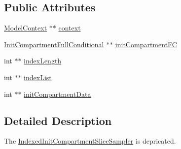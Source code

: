 \subsection*{Public Attributes}
\begin{DoxyCompactItemize}
\item 
\hyperlink{classSpatialSEIR_1_1ModelContext}{Model\-Context} $\ast$$\ast$ \hyperlink{classSpatialSEIR_1_1IndexedInitCompartmentSliceSampler_aeaa9d7c11d3bb0000f236c95a2c8f041}{context}
\item 
\hyperlink{classSpatialSEIR_1_1InitCompartmentFullConditional}{Init\-Compartment\-Full\-Conditional} $\ast$$\ast$ \hyperlink{classSpatialSEIR_1_1IndexedInitCompartmentSliceSampler_a729e2d6ea861584920909fc54d3094f0}{init\-Compartment\-F\-C}
\item 
int $\ast$$\ast$ \hyperlink{classSpatialSEIR_1_1IndexedInitCompartmentSliceSampler_ae7e9d465efab1aff109ab06aa2ca703e}{index\-Length}
\item 
int $\ast$$\ast$ \hyperlink{classSpatialSEIR_1_1IndexedInitCompartmentSliceSampler_ac0ef023fbdf4e7b5e4afdaa112284b6c}{index\-List}
\item 
int $\ast$$\ast$ \hyperlink{classSpatialSEIR_1_1IndexedInitCompartmentSliceSampler_a8660c84e839a34b1a53cb16b9b53f66f}{init\-Compartment\-Data}
\end{DoxyCompactItemize}


\subsection{Detailed Description}
The \hyperlink{classSpatialSEIR_1_1IndexedInitCompartmentSliceSampler}{Indexed\-Init\-Compartment\-Slice\-Sampler} is depricated. 

